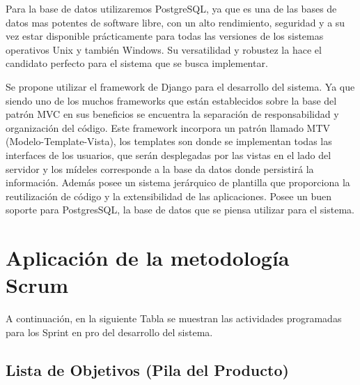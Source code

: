 Para la base de datos utilizaremos PostgreSQL, ya que es una de las bases de datos mas potentes de software libre, con un alto rendimiento, seguridad y a su vez estar disponible prácticamente para todas las versiones de los sistemas operativos Unix y también Windows. Su versatilidad y robustez la hace el candidato perfecto para el sistema que se busca implementar.

Se propone utilizar el framework de Django para el desarrollo del sistema. Ya que siendo uno de los muchos frameworks que están establecidos sobre la base del patrón MVC en sus beneficios se encuentra la separación de responsabilidad y organización del código. Este framework incorpora un patrón llamado MTV (Modelo-Template-Vista), los templates son donde se implementan todas las interfaces de los usuarios, que serán desplegadas por las vistas en el lado del servidor y los mídeles corresponde a la base da datos donde persistirá la información. Además posee un sistema jerárquico de plantilla que proporciona la reutilización de código y la extensibilidad de las aplicaciones. Posee un buen soporte para PostgresSQL, la base de datos que se piensa utilizar para el sistema. 


\setlength{\parskip}{0mm}

\newpage

\section{Aplicación de la metodología Scrum}

A continuación, en la siguiente Tabla se muestran las actividades programadas para los Sprint en pro del desarrollo del sistema. 
\subsection{Lista de Objetivos (Pila del Producto)}

